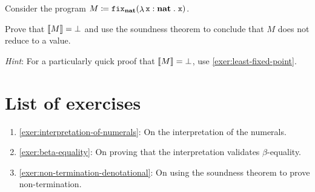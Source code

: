 \begin{exercise}\label{exer:non-termination-denotational}

  Consider the program
  \(M \coloneqq \operatorname{\mathtt{fix}}_\mathtt{\mathbf{nat}} (\mathop{\lambda}{\mathtt x : \mathtt{\mathbf{nat}}}\mathrel{.}\mathtt x)\).

  Prove that \(\llbracket M\rrbracket = \bot\) and use the soundness theorem to conclude
  that \(M\) does not reduce to a value.

  \emph{Hint}: For a particularly quick proof that \(\llbracket M\rrbracket = \bot\), use
  \cref{exer:least-fixed-point}.
\end{exercise}

\section{List of exercises}
\begin{enumerate}
\item \cref{exer:interpretation-of-numerals}: On the interpretation of the numerals.
\item \cref{exer:beta-equality}: On proving that the interpretation validates
  \(\beta\)-equality.
\item \cref{exer:non-termination-denotational}: On using the soundness theorem
  to prove non-termination.
\end{enumerate}

